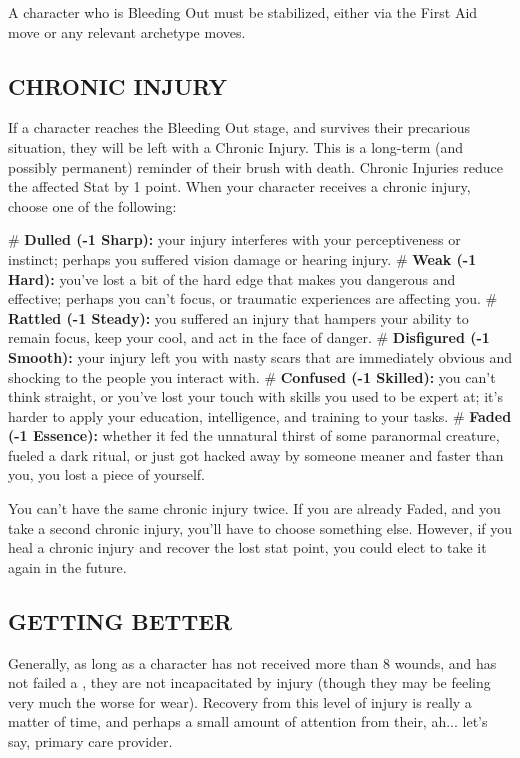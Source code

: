 A character who is Bleeding Out must be stabilized, either via the First Aid move or any relevant archetype moves.


\subsection*{CHRONIC INJURY}
If a character reaches the Bleeding Out stage, and survives their precarious situation, they will be left with a Chronic Injury. This is a long-term (and possibly permanent) reminder of their brush with death. Chronic Injuries reduce the affected Stat by 1 point. When your character receives a chronic injury, choose one of the following:

    \begin{easylist}
        # \textbf{Dulled (-1 Sharp):} your injury interferes with your perceptiveness or instinct; perhaps you suffered vision damage or hearing injury.        
        # \textbf{Weak (-1 Hard):} you’ve lost a bit of the hard edge that makes you dangerous and effective; perhaps you can’t focus, or traumatic experiences are affecting you.        
        # \textbf{Rattled (-1 Steady):} you suffered an injury that hampers your ability to remain focus, keep your cool, and act in the face of danger.        
        # \textbf{Disfigured (-1 Smooth):} your injury left you with nasty scars that are immediately obvious and shocking to the people you interact with.        
        # \textbf{Confused (-1 Skilled):} you can’t think straight, or you’ve lost your touch with skills you used to be expert at; it’s harder to apply your education, intelligence, and training to your tasks.        
        # \textbf{Faded (-1 Essence):} whether it fed the unnatural thirst of some paranormal creature, fueled a dark ritual, or just got hacked away by someone meaner and faster than you, you lost a piece of yourself.
    \end{easylist}
        
You can’t have the same chronic injury twice. If you are already Faded, and you take a second chronic injury, you’ll have to choose something else. However, if you heal a chronic injury and recover the lost stat point, you could elect to take it again in the future.


\subsection*{GETTING BETTER}
Generally, as long as a character has not received more than 8 wounds, and has not failed a , they are not incapacitated by injury (though they may be feeling very much the worse for wear). Recovery from this level of injury is really a matter of time, and perhaps a small amount of attention from their, ah... let’s say, primary care provider.

